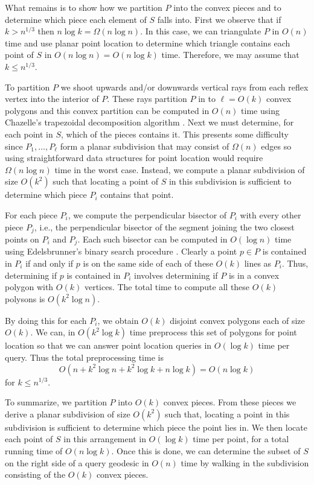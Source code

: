 \documentclass[charterfonts,lotsofwhite]{patmorin}
\begin{document}
What remains is to show how we partition $P$ into the convex pieces
and to determine which piece each element of $S$ falls into.  First we
observe that if $k>n^{1/3}$ then $n\log k=\Omega(n\log n)$.  In this
case, we can triangulate $P$ in $O(n)$ time and use planar point
location to determine which triangle contains each point of $S$ in
$O(n\log n)=O(n\log k)$ time.  Therefore, we may assume that $k\le
n^{1/3}$.

To partition $P$ we shoot upwards and/or downwards vertical rays from
each reflex vertex into the interior of $P$. These rays partition $P$
in to $\ell=O(k)$ convex polygons and this convex partition can be
computed in $O(n)$ time using Chazelle's trapezoidal decomposition
algorithm \cite{c91}.  Next we must determine, for each point in $S$,
which of the pieces contains it.  This presents some difficulty since
$P_1,\ldots,P_\ell$ form a planar subdivision that may consist of
$\Omega(n)$ edges so using straightforward data structures for point
location would require $\Omega(n\log n)$ time in the worst case.
Instead, we compute a planar subdivision of size $O(k^2)$ such that
locating a point of $S$ in this subdivision is sufficient to determine
which piece $P_i$ contains that point.  

For each piece $P_i$, we compute the perpendicular bisector of $P_i$
with every other piece $P_j$, i.e., the perpendicular bisector of the
segment joining the two closest points on $P_i$ and $P_j$.  Each such
bisector can be computed in $O(\log n)$ time using Edelsbrunner's
binary search procedure \cite{e85}. Clearly a point $p\in P$ is
contained in $P_i$ if and only if $p$ is on the same side of each of
these $O(k)$ lines as $P_i$.  Thus, determining if $p$ is contained in
$P_i$ involves determining if $P$ is in a convex polygon with $O(k)$
vertices.  The total time to compute all these $O(k)$ polysons is
$O(k^2\log n)$. 

By doing this for each $P_i$, we obtain $O(k)$ disjoint convex
polygons each of size $O(k)$.  We can, in $O(k^2\log k)$ time
preprocess this set of polygons for point location so that we can
answer point location queries in $O(\log k)$ time per query.  Thus the
total preprocessing time is 
\[ O(n+k^2\log n+k^2\log k + n\log k)= O(n\log k) \]
for $k\le n^{1/3}$.

To summarize, we partition $P$ into $O(k)$ convex pieces.  From these
pieces we derive a planar subdivision of size $O(k^2)$ such that,
locating a point in this subdivision is sufficient to determine which
piece the point lies in.  We then locate each point of $S$ in this
arrangement in $O(\log k)$ time per point, for a total running time of
$O(n\log k)$.  Once this is done, we can determine the subset of $S$
on the right side of a query geodesic in $O(n)$ time by walking in the
subdivision consisting of the $O(k)$ convex pieces. 
\end{document}
